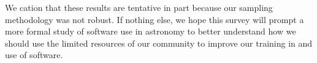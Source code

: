 We cation that these results are tentative in part because our sampling methodology was not robust.  If nothing else, we hope this survey will prompt a more formal study of software use in astronomy to better understand how we should use the limited resources of our community to improve our training in and use of software.


